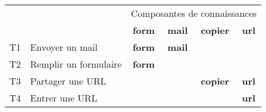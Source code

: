 \documentclass{standalonex}
\begin{document}
\begin{tabular}{rlcccc} \toprule
& & \multicolumn{4}{c}{Composantes de connaissances}\\
& & \textbf{form} & \textbf{mail} & \textbf{copier} & \textbf{url}\\ \midrule
T1 & Envoyer un mail & \textbf{form} & \textbf{mail}\\
T2 & Remplir un formulaire & \textbf{form}\\
T3 & Partager une URL & & & \textbf{copier} & \textbf{url}\\
T4 & Entrer une URL & & & & \textbf{url}\\ \bottomrule
\end{tabular}
\end{document}
